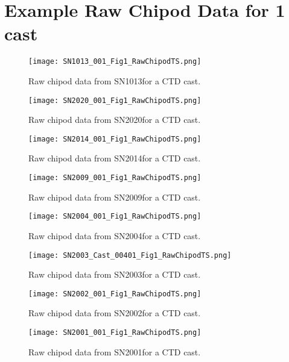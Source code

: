 \documentclass[11pt]{article}
\begin{document}
 \section{Example Raw Chipod Data for 1 cast} 

\begin{figure}[htbp] 
\texttt{[image: SN1013\_001\_Fig1\_RawChipodTS.png]} 
\caption{Raw chipod data from SN1013for a CTD cast.} 
\label{SN1013_1} 
\end{figure} 

\begin{figure}[htbp] 
\texttt{[image: SN2020\_001\_Fig1\_RawChipodTS.png]} 
\caption{Raw chipod data from SN2020for a CTD cast.} 
\label{SN2020_1} 
\end{figure} 

\begin{figure}[htbp] 
\texttt{[image: SN2014\_001\_Fig1\_RawChipodTS.png]} 
\caption{Raw chipod data from SN2014for a CTD cast.} 
\label{SN2014_1} 
\end{figure} 

\begin{figure}[htbp] 
\texttt{[image: SN2009\_001\_Fig1\_RawChipodTS.png]} 
\caption{Raw chipod data from SN2009for a CTD cast.} 
\label{SN2009_1} 
\end{figure} 

\begin{figure}[htbp] 
\texttt{[image: SN2004\_001\_Fig1\_RawChipodTS.png]} 
\caption{Raw chipod data from SN2004for a CTD cast.} 
\label{SN2004_1} 
\end{figure} 

\begin{figure}[htbp] 
\texttt{[image: SN2003\_Cast\_00401\_Fig1\_RawChipodTS.png]} 
\caption{Raw chipod data from SN2003for a CTD cast.} 
\label{SN2003_1} 
\end{figure} 

\begin{figure}[htbp] 
\texttt{[image: SN2002\_001\_Fig1\_RawChipodTS.png]} 
\caption{Raw chipod data from SN2002for a CTD cast.} 
\label{SN2002_1} 
\end{figure} 

\begin{figure}[htbp] 
\texttt{[image: SN2001\_001\_Fig1\_RawChipodTS.png]} 
\caption{Raw chipod data from SN2001for a CTD cast.} 
\label{SN2001_1} 
\end{figure} 
\end{document}
